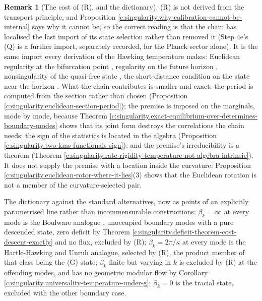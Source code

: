 \documentclass[11pt]{article}
\theoremstyle{definition}
\newtheorem{remark}[theorem]{Remark}
\theoremstyle{plain}
\newcommand{\changedmark}[2]{\marginpar{\raggedright\scriptsize\color{#1}#2}}
\begin{document}
\begin{remark}[The cost of (R), and the dictionary]\label{c:note.singularity.cost-r-dictionary}
\changedmark{gray}{reworded}
(R) is not derived from the transport principle, and Proposition \ref{c:singularity.why-calibration-cannot-be-internal} says why it cannot be, so the correct reading is that the chain has localised the last import of its state selection rather than removed it (Step 4e's (Q) is a further import, separately recorded, for the Planck sector alone). It is the same import every derivation of the Hawking temperature makes: Euclidean regularity at the bifurcation point \cite{GibbonsHawking1977, HartleHawking1976}, regularity on the future horizon \cite{Unruh1976}, nonsingularity of the quasi-free state \cite{KayWald1991}, the short-distance condition on the state near the horizon \cite{FredenhagenHaag1990}. What the chain contributes is smaller and exact: the period is computed from the section rather than chosen (Proposition \ref{c:singularity.euclidean-section-period}); the premise is imposed on the marginals, mode by mode, because Theorem \ref{c:singularity.exact-equilibrium-over-determines-boundary-modes} shows that its joint form destroys the correlations the chain needs; the sign of the statistics is located in the algebra (Proposition \ref{c:singularity.two-kms-functionals-sign}); and the premise's irreducibility is a theorem (Theorem \ref{c:singularity.rate-rigidity-temperature-not-algebra-intrinsic}). It does not supply the premise with a location inside the curvature: Proposition \ref{c:singularity.euclidean-rotor-where-it-lies}(3) shows that the Euclidean rotation is not a member of the curvature-selected pair.

The dictionary against the standard alternatives, now as points of an explicitly parametrised line rather than incommensurable constructions: $\beta_k = \infty$ at every mode is the Boulware analogue \cite{Boulware1975}, unoccupied boundary modes with a pure descended state, zero deficit by Theorem \ref{c:singularity.deficit-theorem-cost-descent-exactly} and no flux, excluded by (R); $\beta_k = 2\pi/\kappa$ at every mode is the Hartle-Hawking and Unruh analogue, selected by (R), the product member of that class being the (G) state; $\beta_k$ finite but varying in $k$ is excluded by (R) at the offending modes, and has no geometric modular flow by Corollary \ref{c:singularity.universality-temperature-under-g}; $\beta_k = 0$ is the tracial state, excluded with the other boundary case.


\end{remark}
\end{document}
